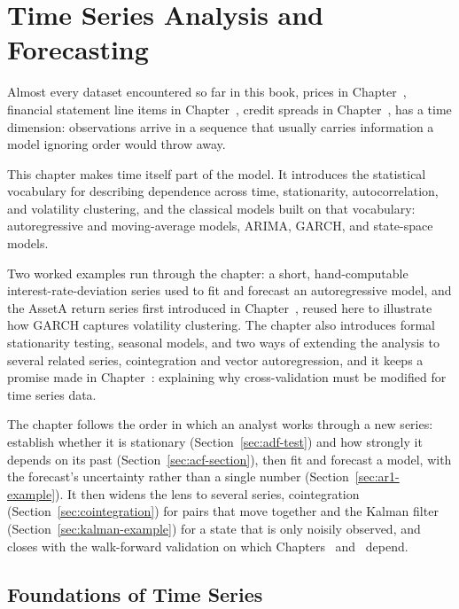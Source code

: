 \documentclass[../ai_in_finance]{subfiles}
\begin{document}
\chapter{Time Series Analysis and Forecasting}

Almost every dataset encountered so far in this book, prices in Chapter~, financial statement line items in Chapter~, credit spreads in Chapter~, has a time dimension: observations arrive in a sequence that usually carries information a model ignoring order would throw away.

This chapter makes time itself part of the model. It introduces the statistical vocabulary for describing dependence across time, stationarity, autocorrelation, and volatility clustering, and the classical models built on that vocabulary: autoregressive and moving-average models, ARIMA, GARCH, and state-space models.

Two worked examples run through the chapter: a short, hand-computable interest-rate-deviation series used to fit and forecast an autoregressive model, and the AssetA return series first introduced in Chapter~, reused here to illustrate how GARCH captures volatility clustering. The chapter also introduces formal stationarity testing, seasonal models, and two ways of extending the analysis to several related series, cointegration and vector autoregression, and it keeps a promise made in Chapter~: explaining why cross-validation must be modified for time series data.

The chapter follows the order in which an analyst works through a new series: establish whether it is stationary (Section~\ref{sec:adf-test}) and how strongly it depends on its past (Section~\ref{sec:acf-section}), then fit and forecast a model, with the forecast's uncertainty rather than a single number (Section~\ref{sec:ar1-example}). It then widens the lens to several series, cointegration (Section~\ref{sec:cointegration}) for pairs that move together and the Kalman filter (Section~\ref{sec:kalman-example}) for a state that is only noisily observed, and closes with the walk-forward validation on which Chapters~ and~ depend.

\section{Foundations of Time Series}
\end{document}
